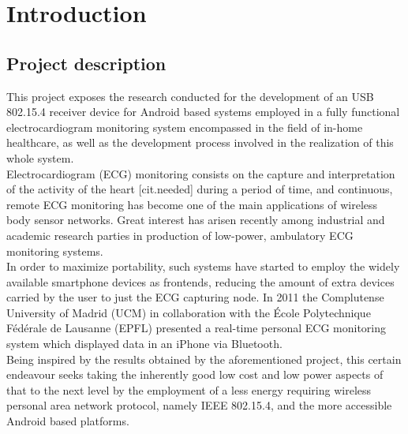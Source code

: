 \newcommand{\refer}[1]{\autoref{#1} \emph{\nameref{#1}}}

\chapter{Introduction}
\label{cha:intro}
	\section{Project description}
	\label{sec:prj-descr}

		This project exposes the research conducted for the development of an USB 802.15.4 receiver device for Android based systems employed in a fully functional electrocardiogram monitoring system encompassed in the field of in-home healthcare, as well as the development process involved in the realization of this whole system.\\ %

		Electrocardiogram (ECG) monitoring consists on the capture and interpretation of the activity of the heart [cit.needed] during a period of time, and continuous, remote ECG monitoring has become one of the main applications of wireless body sensor networks. Great interest has arisen recently among industrial and academic research parties in production of low-power, ambulatory ECG monitoring systems.\\

		In order to maximize portability, such systems have started to employ the widely available smartphone devices as frontends, reducing the amount of extra devices carried by the user to just the ECG capturing node. In 2011 the Complutense University of Madrid (UCM) in collaboration with the École Polytechnique Fédérale de Lausanne (EPFL) presented a real-time personal ECG monitoring system which displayed data in an iPhone via Bluetooth.\\

		Being inspired by the results obtained by the aforementioned project, this certain  endeavour seeks taking the inherently good low cost and low power aspects of that to the next level by the employment of a less energy requiring wireless personal area network protocol, namely IEEE 802.15.4, and the more accessible Android based platforms.\\

